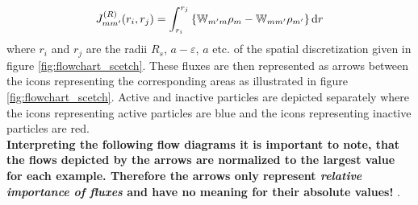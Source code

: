 \begin{equation}
    J_{mm'}^{(R)}(r_i,r_j) =\int_{r_i}^{r_j} \left\{ \mathbb{W}_{m'm}\rho_m - \mathbb{W}_{mm'} \rho_{m'} \right\} {\rm d} r
    \label{reaction_flux}
\end{equation}
where $r_i$ and $r_j$ are the radii $R_s$, $a-\varepsilon$, $a$ etc. of the spatial discretization given in figure \ref{fig:flowchart_scetch}.
These fluxes are then represented as arrows between the icons representing the corresponding areas as illustrated in figure \ref{fig:flowchart_scetch}. Active and inactive particles are depicted separately where the icons representing active particles are blue and the icons representing inactive particles are red. \\ \textbf{Interpreting the following flow diagrams it is important to note, that the flows depicted by the arrows are normalized to the largest value for each example. Therefore the arrows only represent \emph{relative importance of fluxes} and have no meaning for their absolute values!}
. \\ \vspace{-1.3 cm}

